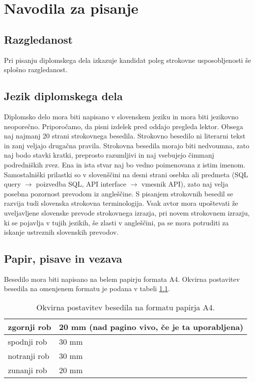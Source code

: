 \documentclass[12pt,a4paper,openany]{book}
\begin{document}
\chapter{Navodila za pisanje}

\section{Razgledanost}
Pri pisanju diplomskega dela izkazuje kandidat poleg strokovne uspo\-sob\-lje\-nos\-ti še splošno razgledanost.

\section{Jezik diplomskega dela}
Diplomsko delo mora biti napisano v slovenskem jeziku in mora biti jezikovno neoporečno. 
Priporočamo, da pisni izdelek pred oddajo pregleda lektor. Obsega naj najmanj 20 strani strokovnega besedila. Stro\-kov\-no besedilo ni
li\-te\-rar\-ni tekst in zanj veljajo drugačna pravila. Stro\-kov\-na besedila morajo biti nedvoumna, zato naj bodo stavki kratki, preprosto
razumljivi in naj vsebujejo čimmanj podredniških zvez. Ena in ista stvar naj bo vedno poimenovana z istim imenom. Samostalniški prilastki so v
slovenščini na desni strani osebka ali predmeta (SQL query $\rightarrow$ poizvedba SQL, API interface $\rightarrow$ vmesnik API), zato naj
velja posebna pozornost prevodom iz angleščine. S pisanjem strokovnih besedil se razvija tudi slovenska strokovna terminologija. Vsak avtor
mora upo\-šte\-va\-ti že uveljavljene slovenske prevode strokovnega izrazja, pri novem stro\-kov\-nem izrazju, ki se pojavlja v tujih jezikih,
še zlasti v angleščini, pa se mora potruditi za iskanje ustreznih slovenskih prevodov. 

\section{Papir, pisave in vezava}
Besedilo mora biti napisano na belem papirju formata A4.
Okvirna postavitev besedila na omenjenem formatu je podana v tabeli \ref{tabela_mere}.

\begin{table}[htb]
\begin{center}
\begin{tabular}{|l|l|}\hline
zgornji rob	 & 20 mm (nad pagino vivo, če je ta uporabljena)\\\hline
spodnji rob	 & 30 mm\\\hline
notranji rob & 30 mm\\\hline
zunanji rob	 & 20 mm\\\hline
\end{tabular}
\end{center}
\caption[Okvirna postavitev besedila.]{Okvirna postavitev besedila na formatu papirja A4.}
\label{tabela_mere}
\end{table}
\end{document}
